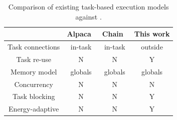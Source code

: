 \begin{table}
	\begin{tabular}{|c|c|c|c|}
		\hline
		{~} & Alpaca~\cite{alpaca} & Chain~\cite{chain} & This work \\
		\hline\hline
		Task connections & in-task & in-task & outside \\
		Task re-use & N & N & Y\\
		Memory model & globals & globals & globals\\
		Concurrency & N & N & N \\
		Task blocking & N & N & Y \\
		Energy-adaptive & N & N & Y \\
		\hline
	\end{tabular}
	\caption{Comparison of existing task-based execution models against \sys.}
	\label{table:feature_comparison}
\end{table}



%
%



